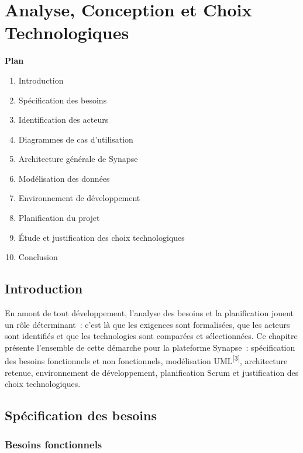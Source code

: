 ﻿%
\chapter{Analyse, Conception et Choix Technologiques}

\noindent\textbf{Plan}
\begin{enumerate}
  \item Introduction
  \item Spécification des besoins
  \item Identification des acteurs
  \item Diagrammes de cas d’utilisation
  \item Architecture générale de Synapse
  \item Modélisation des données
  \item Environnement de développement
  \item Planification du projet
  \item Étude et justification des choix technologiques
  \item Conclusion
\end{enumerate}

\section{Introduction}

En amont de tout développement, l’analyse des besoins et la planification jouent
un rôle déterminant~: c’est là que les exigences sont formalisées, que les acteurs
sont identifiés et que les technologies sont comparées et sélectionnées. Ce chapitre
présente l’ensemble de cette démarche pour la plateforme Synapse~: spécification des
besoins fonctionnels et non fonctionnels, modélisation UML\textsuperscript{[3]}, architecture retenue,
environnement de développement, planification Scrum et justification des choix
technologiques.

\section{Spécification des besoins}

\subsection{Besoins fonctionnels}


